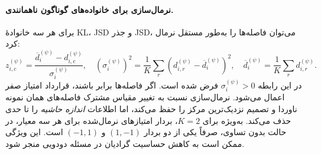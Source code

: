 \paragraph{نرمال‌سازی برای خانواده‌های گوناگون ناهمانندی.}
برای هر سه خانوادهٔ KL، JSD و جذر JSD،
می‌توان فاصله‌ها را به‌طور مستقل نرمال کرد:
\begin{equation}\label{cmp:eq:ch3-normalized-distance-family}
\boxed{
z_{i,c}^{(\psi)}
=\frac{\overline d_i^{(\psi)}-d_{i,c}^{(\psi)}}
{\sigma_i^{(\psi)}},
\quad
(\sigma_i^{(\psi)})^2
=\frac1K\sum_r(d_{i,r}^{(\psi)}-\overline d_i^{(\psi)})^2,
\quad
\overline d_i^{(\psi)}=\frac1K\sum_r d_{i,r}^{(\psi)}.
}
\end{equation}
در این رابطه $\sigma_i^{(\psi)}>0$ فرض شده است.
اگر فاصله‌ها برابر باشند، قرارداد امتیاز صفر
اعمال می‌شود. نرمال‌سازی نسبت به تغییر مقیاس
مشترک فاصله‌های همان نمونه ناوردا و تصمیم
نزدیک‌ترین مرکز را حفظ می‌کند، اما اطلاعات
\emph{اندازه حاشیه} را تا حدی حذف می‌کند.
به‌ویژه برای $K=2$، بردار امتیازهای
نرمال‌شده برای هر سه معیار، در حالت بدون تساوی،
صرفاً یکی از دو بردار $(1,-1)$ و $(-1,1)$
است. این ویژگی ممکن است به کاهش حساسیت
گرادیان در مسئله دودویی منجر شود.





